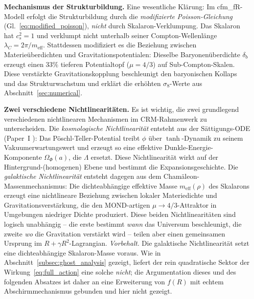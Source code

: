 \documentclass[11pt,a4paper]{article}
\begin{document}
\textbf{Mechanismus der Strukturbildung.} Eine wesentliche Kl\"arung: Im cfm\_fR-Modell erfolgt die Strukturbildung durch die \textit{modifizierte Poisson-Gleichung} (Gl.~\ref{eq:modified_poisson}), \textit{nicht} durch Skalaron-Verklumpung. Das Skalaron hat $c_s^2 = 1$ und verklumpt nicht unterhalb seiner Compton-Wellenl\"ange $\lambda_C = 2\pi/m_{\mathrm{eff}}$. Stattdessen modifiziert es die Beziehung zwischen Materie\"uberdichten und Gravitationspotentialen: Dieselbe Baryonen\"uberdichte $\delta_b$ erzeugt einen $33\%$ tieferen Potentialtopf ($\mu = 4/3$) auf Sub-Compton-Skalen. Diese verst\"arkte Gravitationskopplung beschleunigt den baryonischen Kollaps und das Strukturwachstum und erkl\"art die erh\"ohten $\sigma_8$-Werte aus Abschnitt~\ref{sec:numerical}.

\textbf{Zwei verschiedene Nichtlinearit\"aten.} Es ist wichtig, die zwei grundlegend verschiedenen nichtlinearen Mechanismen im CRM-Rahmenwerk zu unterscheiden. Die \textit{kosmologische Nichtlinearit\"at} entsteht aus der S\"attigungs-ODE (Paper~I \cite{Geiger2026}): Das P\"oschl-Teller-Potential treibt $\phi$ \"uber $\tanh$-Dynamik zu seinem Vakuumerwartungswert und erzeugt so eine effektive Dunkle-Energie-Komponente $\Omega_\Phi(a)$, die $\Lambda$ ersetzt. Diese Nichtlinearit\"at wirkt auf der Hintergrund-(homogenen) Ebene und bestimmt die Expansionsgeschichte. Die \textit{galaktische Nichtlinearit\"at} entsteht dagegen aus dem Cham\"aleon-Massenmechanismus: Die dichteabh\"angige effektive Masse $m_{\mathrm{eff}}(\rho)$ des Skalarons erzeugt eine nichtlineare Beziehung zwischen lokaler Materiedichte und Gravitationsverst\"arkung, die den MOND-artigen $\mu \to 4/3$-Attraktor in Umgebungen niedriger Dichte produziert. Diese beiden Nichtlinearit\"aten sind logisch unabh\"angig -- die erste bestimmt \textit{wann} das Universum beschleunigt, die zweite \textit{wo} die Gravitation verst\"arkt wird -- teilen aber einen gemeinsamen Ursprung im $R + \gamma R^2$-Lagrangian. \textit{Vorbehalt.} Die galaktische Nichtlinearit\"at setzt eine dichteabh\"angige Skalaron-Masse voraus. Wie in Abschnitt~\ref{subsec:ghost_analysis} gezeigt, liefert der rein quadratische Sektor der Wirkung~\eqref{eq:full_action} eine solche \textit{nicht}; die Argumentation dieses und des folgenden Absatzes ist daher an eine Erweiterung von $f(R)$ mit echtem Abschirmmechanismus gebunden und hier nicht gezeigt.
\end{document}
